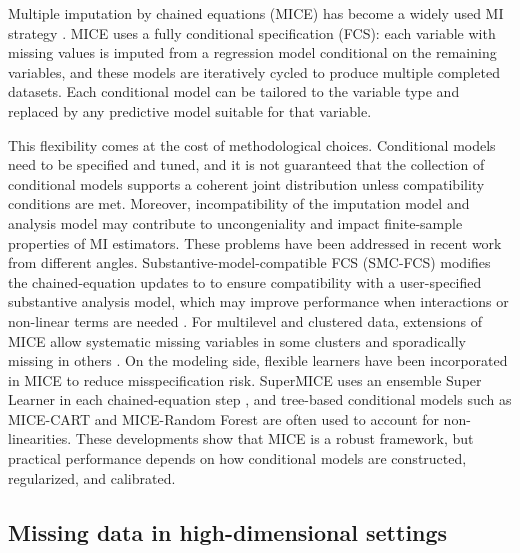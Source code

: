\documentclass[12pt]{article}
\begin{document}
Multiple imputation by chained equations (MICE) has become a widely used MI strategy \citep{buuren_flexible_2018}. MICE uses a fully conditional specification (FCS): each variable with missing values is imputed from a regression model conditional on the remaining variables, and these models are iteratively cycled to produce multiple completed datasets. Each conditional model can be tailored to the variable type and replaced by any predictive model suitable for that variable.

This flexibility comes at the cost of  methodological choices. Conditional models need to be specified and tuned, and it is not guaranteed that the collection of conditional models supports a coherent joint distribution unless compatibility conditions are met.  Moreover, incompatibility of the imputation model and analysis model may contribute to uncongeniality and impact finite-sample properties of MI estimators\citep{meng_multiple-imputation_1994,bartlett_multiple_2015,murray_multiple_2018}. These problems have been addressed in recent work from different angles. Substantive-model-compatible FCS (SMC-FCS) modifies the chained-equation updates to to ensure compatibility with a user-specified substantive analysis model, which may improve performance when interactions or non-linear terms are needed \citep{bartlett_multiple_2015}. For multilevel and clustered data, extensions of MICE allow systematic missing variables in some clusters and sporadically missing in others \citep{resche-rigon_multiple_2018,enders_multilevel_2016}.
On the modeling side, flexible learners have been incorporated in MICE to reduce misspecification risk. SuperMICE uses an ensemble Super Learner in each chained-equation step
\citep{laqueur_supermice_2022}, and tree-based conditional models such as MICE-CART and MICE-Random Forest are often used to account for non-linearities\citep{doove_recursive_2014,shah_comparison_2014}.
These developments show that MICE is a robust framework, but practical performance depends on how conditional models are constructed, regularized, and calibrated.

\subsection{Missing data in high-dimensional settings}
\label{subsec:background_highdim}
\end{document}
